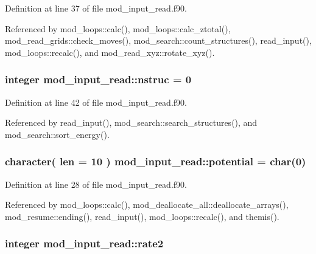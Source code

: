 Definition at line 37 of file mod\+\_\+input\+\_\+read.\+f90.



Referenced by mod\+\_\+loops\+::calc(), mod\+\_\+loops\+::calc\+\_\+ztotal(), mod\+\_\+read\+\_\+grids\+::check\+\_\+moves(), mod\+\_\+search\+::count\+\_\+structures(), read\+\_\+input(), mod\+\_\+loops\+::recalc(), and mod\+\_\+read\+\_\+xyz\+::rotate\+\_\+xyz().

\subsubsection[{\texorpdfstring{nstruc}{nstruc}}]{\setlength{\rightskip}{0pt plus 5cm}integer mod\+\_\+input\+\_\+read\+::nstruc = 0}\hypertarget{namespacemod__input__read_a176a374fb1f2efbff8fdca2a950c77b0}{}\label{namespacemod__input__read_a176a374fb1f2efbff8fdca2a950c77b0}


Definition at line 42 of file mod\+\_\+input\+\_\+read.\+f90.



Referenced by read\+\_\+input(), mod\+\_\+search\+::search\+\_\+structures(), and mod\+\_\+search\+::sort\+\_\+energy().

\subsubsection[{\texorpdfstring{potential}{potential}}]{\setlength{\rightskip}{0pt plus 5cm}character( len = 10 ) mod\+\_\+input\+\_\+read\+::potential = char(0)}\hypertarget{namespacemod__input__read_af992e8c0badb490ee9f1d75568de6372}{}\label{namespacemod__input__read_af992e8c0badb490ee9f1d75568de6372}


Definition at line 28 of file mod\+\_\+input\+\_\+read.\+f90.



Referenced by mod\+\_\+loops\+::calc(), mod\+\_\+deallocate\+\_\+all\+::deallocate\+\_\+arrays(), mod\+\_\+resume\+::ending(), read\+\_\+input(), mod\+\_\+loops\+::recalc(), and themis().

\subsubsection[{\texorpdfstring{rate2}{rate2}}]{\setlength{\rightskip}{0pt plus 5cm}integer mod\+\_\+input\+\_\+read\+::rate2}\hypertarget{namespacemod__input__read_a55525057629121499c3d3fb26c7bf282}{}\label{namespacemod__input__read_a55525057629121499c3d3fb26c7bf282}


